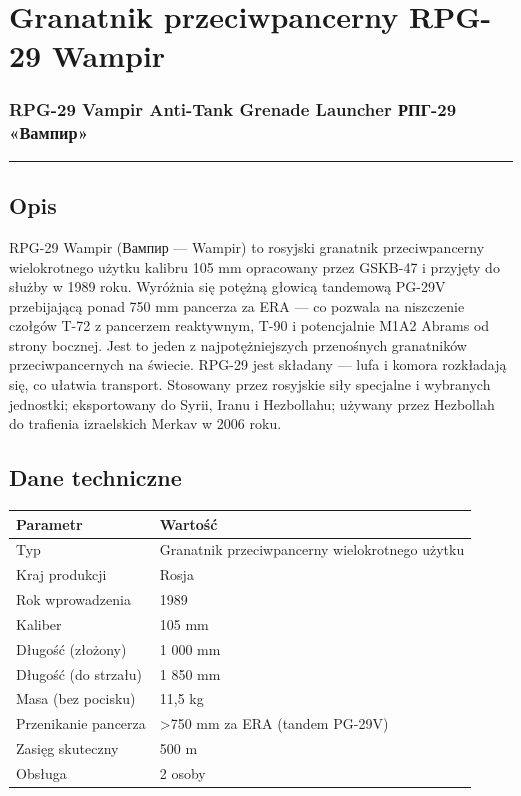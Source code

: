 \documentclass[12pt,openany,oneside]{book}
\begin{document}
\chapter{Granatnik przeciwpancerny RPG-29
Wampir}\label{granatnik-przeciwpancerny-rpg-29-wampir}

\subsection{RPG-29 Vampir Anti-Tank Grenade Launcher \textbar{} РПГ-29
«Вампир»}\label{rpg-29-vampir-anti-tank-grenade-launcher-ux440ux43fux433-29-ux432ux430ux43cux43fux438ux440}

\begin{center}\rule{0.5\linewidth}{0.5pt}\end{center}

\section{Opis}\label{opis-73}

RPG-29 Wampir (Вампир --- Wampir) to rosyjski granatnik przeciwpancerny
wielokrotnego użytku kalibru 105 mm opracowany przez GSKB-47 i przyjęty
do służby w 1989 roku. Wyróżnia się potężną głowicą tandemową PG-29V
przebijającą ponad 750 mm pancerza za ERA --- co pozwala na niszczenie
czołgów T-72 z pancerzem reaktywnym, T-90 i potencjalnie M1A2 Abrams od
strony bocznej. Jest to jeden z najpotężniejszych przenośnych
granatników przeciwpancernych na świecie. RPG-29 jest składany --- lufa
i komora rozkładają się, co ułatwia transport. Stosowany przez rosyjskie
siły specjalne i wybranych jednostki; eksportowany do Syrii, Iranu i
Hezbollahu; używany przez Hezbollah do trafienia izraelskich Merkav w
2006 roku.

\section{Dane techniczne}\label{dane-techniczne-73}

\begin{longtable}[]{@{}ll@{}}
\toprule\noalign{}
Parametr & Wartość \\
\midrule\noalign{}
\endhead
\bottomrule\noalign{}
\endlastfoot
Typ & Granatnik przeciwpancerny wielokrotnego użytku \\
Kraj produkcji & Rosja \\
Rok wprowadzenia & 1989 \\
Kaliber & 105 mm \\
Długość (złożony) & 1 000 mm \\
Długość (do strzału) & 1 850 mm \\
Masa (bez pocisku) & 11,5 kg \\
Przenikanie pancerza & \textgreater750 mm za ERA (tandem PG-29V) \\
Zasięg skuteczny & 500 m \\
Obsługa & 2 osoby \\
\end{longtable}
\end{document}

